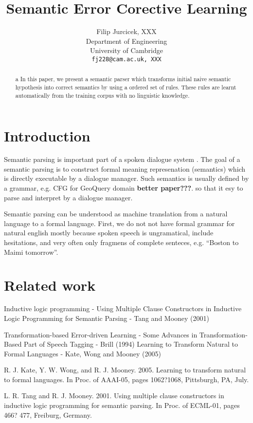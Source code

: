\documentclass[11pt]{article}
\title{Semantic Error Corective Learning}
\author{Filip Jurcicek, XXX \\
  Department of Engineering \\
  University of Cambridge \\
  {\tt fj228@cam.ac.uk, XXX}}
\date{}
\begin{document}
\maketitle
\begin{abstract}a
  In this paper, we present a semantic parser which transforms initial naive semantic hypothesis into correct semantics by using a ordered set of rules. These rules are learnt automatically from the training corpus with no linguistic knowledge.
\end{abstract}

\section{Introduction}

Semantic parsing is important part of a spoken dialogue system \cite{williams07,thomson08}. The goal of a semantic parsing is to construct formal meaning represenation (semantics) which is directly executable by a dialogue manager. Such semantics is usually defined by a grammar, e.g. CFG for GeoQuery domain \cite{wong06} \textbf{better paper???}. so that it esy to parse and interpret by a dialogue manager.

Semantic parsing can be understood as machine translation from a natural language to a formal language. First, we do not not have formal grammar for natural english mostly because spoken speech is ungramatical, include hesitations, and very often only fragmens of complete senteces, e.g. ``Boston to Maimi tomorrow''. 

\section{Related work}

Inductive logic programming - Using Multiple Clause Constructors in Inductive Logic Programming for Semantic Parsing - Tang and Mooney (2001)

Transformation-based Error-driven Learning - Some Advances in Transformation-Based Part of Speech Tagging - Brill (1994)
Learning to Transform Natural to Formal Languages - Kate, Wong and Mooney (2005)

R. J. Kate, Y. W. Wong, and R. J. Mooney. 2005. Learning
to transform natural to formal languages. In Proc.
of AAAI-05, pages 1062?1068, Pittsburgh, PA, July.

L. R. Tang and R. J. Mooney. 2001. Using multiple
clause constructors in inductive logic programming for
semantic parsing. In Proc. of ECML-01, pages 466?
477, Freiburg, Germany.
\end{document}
